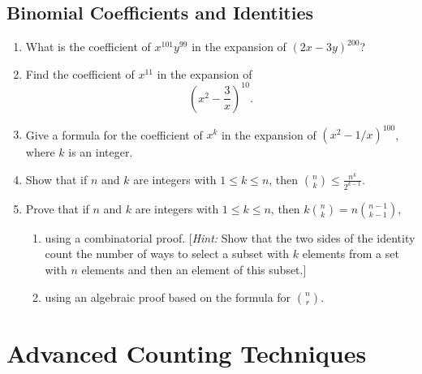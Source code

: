 \documentclass{../../cls/sig-alternate-05-2015}
\begin{document}
\subsection{Binomial Coefficients and Identities}

\begin{enumerate}
    \item What is the coefficient of $x^{101}y^{99}$ in the expansion of
    $(2x-3y)^{200}$?
    \item Find the coefficient of $x^{11}$ in the expansion of \begin{equation}
        (x^2-\frac{3}{x})^{10}.
    \end{equation}

    \item Give a formula for the coefficient of $x^k$ in the expansion
    of $(x^2 - 1/x)^{100}$, where $k$ is an integer.

    \item Show that if $n$ and $k$ are integers with $1 \le k \le n$, then $\binom{n}{k} \le \frac{n^k}{2^{k - 1}}$.

    \item Prove that if $n$ and $k$ are integers with $1 \le k \le n$, then $k \binom{n}{k} = n \binom{n - 1}{k - 1}$,\begin{enumerate}
        \item using a combinatorial proof. [\textit{Hint:} Show that the two sides of the identity count the number of ways to select a subset with $k$ elements from a set with $n$ elements and then an element of this subset.]
        \item using an algebraic proof based on the formula for $\binom{n}{r}$.
    \end{enumerate}
\end{enumerate}

\section{Advanced Counting Techniques}
\end{document}
